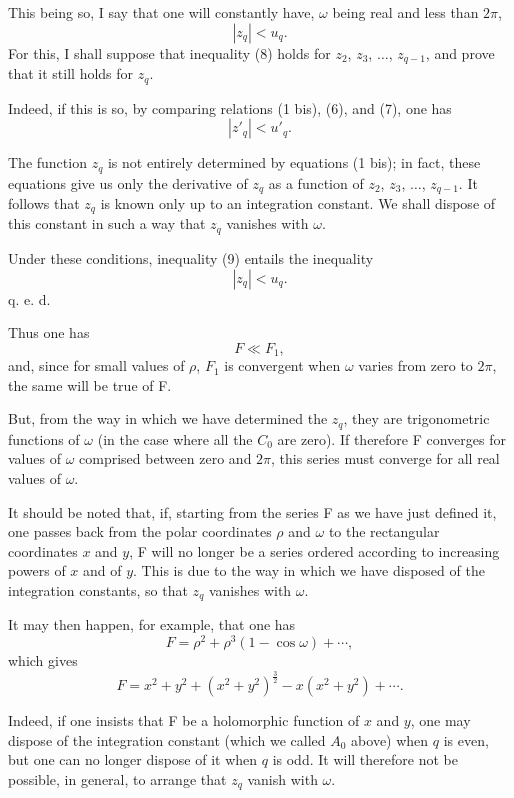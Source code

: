 \documentclass[11pt]{article}
\begin{document}
This being so, I say that one will constantly have, $\omega$ being real and less than $2\pi$,
\begin{equation}\tag{8}
|z_q|<u_q.
\end{equation}
For this, I shall suppose that inequality (8) holds for $z_2$, $z_3$, $\ldots$, $z_{q-1}$, and prove that it still holds for $z_q$.

Indeed, if this is so, by comparing relations (1 bis), (6), and (7), one has
\begin{equation}\tag{9}
|z'_q|<u'_q.
\end{equation}

The function $z_q$ is not entirely determined by equations (1 bis); in fact, these equations give us only the derivative of $z_q$ as a function of $z_2$, $z_3$, $\ldots$, $z_{q-1}$. It follows that $z_q$ is known only up to an integration constant. We shall dispose of this constant in such a way that $z_q$ vanishes with $\omega$.

Under these conditions, inequality (9) entails the inequality
\[
|z_q|<u_q.
\]
\hfill q. e. d.

Thus one has
\[
F\ll F_1,
\]
and, since for small values of $\rho$, $F_1$ is convergent when $\omega$ varies from zero to $2\pi$, the same will be true of F.

But, from the way in which we have determined the $z_q$, they are trigonometric functions of $\omega$ (in the case where all the $C_0$ are zero). If therefore F converges for values of $\omega$ comprised between zero and $2\pi$, this series must converge for all real values of $\omega$.

It should be noted that, if, starting from the series F as we have just defined it, one passes back from the polar coordinates $\rho$ and $\omega$ to the rectangular coordinates $x$ and $y$, F will no longer be a series ordered according to increasing powers of $x$ and of $y$. This is due to the way in which we have disposed of the integration constants, so that $z_q$ vanishes with $\omega$.

It may then happen, for example, that one has
\[
F=\rho^2+\rho^3(1-\cos\omega)+\cdots,
\]
which gives
\[
F=x^2+y^2+(x^2+y^2)^{\frac32}-x(x^2+y^2)+\cdots.
\]

Indeed, if one insists that F be a holomorphic function of $x$ and $y$, one may dispose of the integration constant (which we called $A_0$ above) when $q$ is even, but one can no longer dispose of it when $q$ is odd. It will therefore not be possible, in general, to arrange that $z_q$ vanish with $\omega$.
\end{document}
